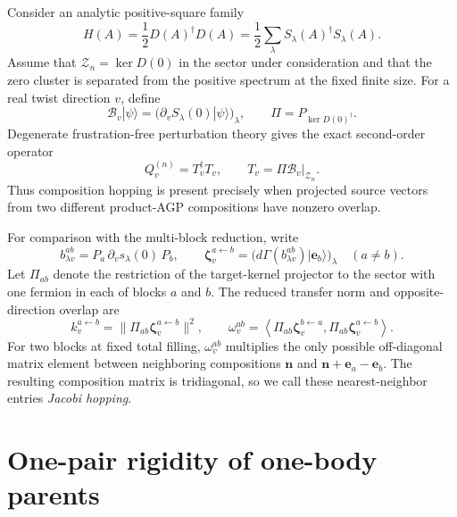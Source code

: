 \documentclass[11pt]{article}
\theoremstyle{remark}
\newcommand{\cZ}{\mathcal Z}
\newcommand{\cB}{\mathcal B}
\newcommand{\be}{\mathbf e}
\newcommand{\bn}{\mathbf n}
\begin{document}
Consider an analytic positive-square family
\begin{equation}
 H(A)=\frac12D(A)^\dagger D(A)
 =\frac12\sum_\lambda S_\lambda(A)^\dagger S_\lambda(A).
 \label{eq:H-positive}
\end{equation}
Assume that $\cZ_n=\ker D(0)$ in the sector under consideration and that the
zero cluster is separated from the positive spectrum at the fixed finite size.
For a real twist direction $v$, define
\begin{equation}
 \cB_v|\psi\rangle
 =\bigl(\partial_vS_\lambda(0)|\psi\rangle\bigr)_\lambda,
 \qquad
 \Pi=P_{\ker D(0)^\dagger}.
 \label{eq:source-map}
\end{equation}
Degenerate frustration-free perturbation theory gives the exact second-order
operator
\begin{equation}
 Q_v^{(n)}=T_v^\dagger T_v,
 \qquad
 T_v=\Pi\cB_v|_{\cZ_n}.
 \label{eq:Q-T}
\end{equation}
Thus composition hopping is present precisely when projected source vectors
from two different product-AGP compositions have nonzero overlap.

For comparison with the multi-block reduction, write
\begin{equation}
 b_{\lambda v}^{ab}=P_a\,\partial_vs_\lambda(0)\,P_b,
 \qquad
 \bm{\zeta}_v^{a\leftarrow b}
 =\bigl(d\Gamma(b_{\lambda v}^{ab})|\be_b\rangle\bigr)_\lambda
 \quad(a\ne b).
 \label{eq:transfer-seed-def}
\end{equation}
Let $\Pi_{ab}$ denote the restriction of the target-kernel projector to the
sector with one fermion in each of blocks $a$ and $b$.  The reduced transfer
norm and opposite-direction overlap are
\begin{equation}
 k_v^{a\leftarrow b}
 =\|\Pi_{ab}\bm{\zeta}_v^{a\leftarrow b}\|^2,
 \qquad
 \omega_v^{ab}
 =\left\langle
 \Pi_{ab}\bm{\zeta}_v^{b\leftarrow a},
 \Pi_{ab}\bm{\zeta}_v^{a\leftarrow b}
 \right\rangle.
 \label{eq:transfer-data-def}
\end{equation}
For two blocks at fixed total filling, $\omega_v^{ab}$ multiplies the only
possible off-diagonal matrix element between neighboring compositions
$\bn$ and $\bn+\be_a-\be_b$.  The resulting composition matrix is tridiagonal,
so we call these nearest-neighbor entries \emph{Jacobi hopping}.

\section{One-pair rigidity of one-body parents}
\end{document}
